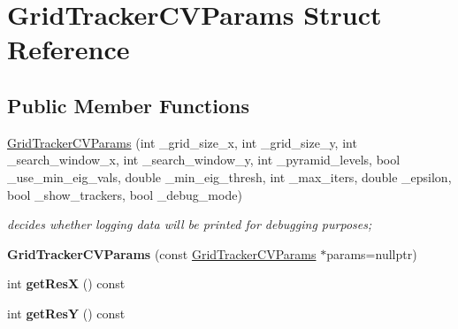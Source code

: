 \hypertarget{structGridTrackerCVParams}{\section{Grid\-Tracker\-C\-V\-Params Struct Reference}
\label{structGridTrackerCVParams}
}
\subsection*{Public Member Functions}
\begin{DoxyCompactItemize}
\item 
\hyperlink{structGridTrackerCVParams_a3f50b3a3d6fc9be0708503e6c853fff4}{Grid\-Tracker\-C\-V\-Params} (int \-\_\-grid\-\_\-size\-\_\-x, int \-\_\-grid\-\_\-size\-\_\-y, int \-\_\-search\-\_\-window\-\_\-x, int \-\_\-search\-\_\-window\-\_\-y, int \-\_\-pyramid\-\_\-levels, bool \-\_\-use\-\_\-min\-\_\-eig\-\_\-vals, double \-\_\-min\-\_\-eig\-\_\-thresh, int \-\_\-max\-\_\-iters, double \-\_\-epsilon, bool \-\_\-show\-\_\-trackers, bool \-\_\-debug\-\_\-mode)
\begin{DoxyCompactList}\small\item\em decides whether logging data will be printed for debugging purposes; \end{DoxyCompactList}\item 
\hypertarget{structGridTrackerCVParams_ab4caf7846c035ac58ce494dc160f670c}{{\bfseries Grid\-Tracker\-C\-V\-Params} (const \hyperlink{structGridTrackerCVParams}{Grid\-Tracker\-C\-V\-Params} $\ast$params=nullptr)}\label{structGridTrackerCVParams_ab4caf7846c035ac58ce494dc160f670c}

\item 
\hypertarget{structGridTrackerCVParams_a2c74f101f8f42405c52c4a6230494d7a}{int {\bfseries get\-Res\-X} () const }\label{structGridTrackerCVParams_a2c74f101f8f42405c52c4a6230494d7a}

\item 
\hypertarget{structGridTrackerCVParams_a60859080f03d85bf3aca3185ed34ec1f}{int {\bfseries get\-Res\-Y} () const }\label{structGridTrackerCVParams_a60859080f03d85bf3aca3185ed34ec1f}

\end{DoxyCompactItemize}

